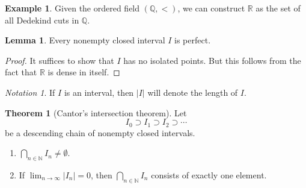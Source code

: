 \documentclass[10pt,letterpaper,cm]{nupset}
\theoremstyle{definition}
\newtheorem{exmp}[definition]{Example}
\theoremstyle{theorem}
\newtheorem{theorem}[definition]{Theorem}
\newtheorem{lemma}[definition]{Lemma}
\theoremstyle{remark}
\newtheorem*{notation}{Notation}
\newcommand{\N}{\mathbb N}
\newcommand{\Q}{\mathbb Q}
\newcommand{\R}{\mathbb R}
\newcommand{\1}{\mathbf{1}}
\newcommand{\0}{\vec 0}
\begin{document}
\begin{exmp}
Given the ordered field $\left(\Q, <\right)$, we can construct $\R$ as the set of all Dedekind cuts in $\Q$.
\end{exmp}

\begin{lemma}
Every nonempty closed interval $I$ is perfect.
\end{lemma}
\begin{proof}
It suffices to show that $I$ has no isolated points. But this follows from the fact that $\R$ is dense in itself. 
\end{proof}

\begin{notation}
If $I$ is an interval, then $\left\lvert{I}\right\rvert$ will denote the length of $I$.
\end{notation}

\begin{theorem}[Cantor's intersection theorem] Let $$I_0 \supset I_1 \supset I_2 \supset \cdots $$ be a descending chain of nonempty closed intervals.
\begin{enumerate}
\item $\bigcap_{n\in \N} I_n \ne \emptyset$.
\item If $\lim_{n\to \infty} \left\lvert{I_n}\right\rvert =0$, then $\bigcap_{n\in \N} I_n$ consists of exactly one element. 
\end{enumerate}
\end{theorem}
\end{document}
